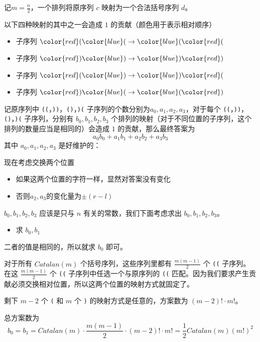 \documentclass[UTF8]{beamer}
\begin{document}
    \begin{frame}
        记$m=\frac{n}{2}$，一个排列将原序列 $c$ 映射为一个合法括号序列 $d$。

以下四种映射的其中之一会造成 $1$ 的贡献（颜色用于表示相对顺序）

\begin{itemize}
    \item 子序列 ${\color{red}(}{\color{blue}(}\to{\color{blue}(}{\color{red}(}$
    \item 子序列 ${\color{red})}{\color{blue})}\to{\color{blue})}{\color{red})}$
    \item 子序列 ${\color{red}(}{\color{blue})}\to{\color{blue})}{\color{red}(}$
    \item 子序列 ${\color{red})}{\color{blue}(}\to{\color{blue}(}{\color{red})}$
\end{itemize}


记原序列中 \texttt{((}，\texttt{))}，\texttt{()}，\texttt{)(} 子序列的个数分别为$a_0,a_1,a_2,a_3$，对于每个 \texttt{((}，\texttt{))}，\texttt{()}，\texttt{)(} 子序列，分别有 $b_0,b_1,b_2,b_3$ 个排列的映射（对于不同位置的子序列，这个排列的数量应当是相同的）会造成 $1$ 的贡献，那么最终答案为
$$
a_0b_0+a_1b_1+a_2b_2+a_3b_3
$$
\pause
其中 $a_0,a_1,a_2,a_3$ 是好维护的：

现在考虑交换两个位置
\begin{itemize}
    \item 如果这两个位置的字符一样，显然对答案没有变化
    \item 否则$a_2,a_3$的变化量为$\pm (r-l)$
\end{itemize}

$b_0,b_1,b_2,b_3$ 应该是只与 $n$ 有关的常数，我们下面考虑求出 $b_0,b_1,b_2,b_3$。
    \end{frame}

    \begin{frame}
        \begin{itemize}
            \item 求 $b_0,b_1$
        \end{itemize}

        二者的值是相同的，所以就求 $b_0$ 即可。

        对于所有 $Catalan(m)$ 个括号序列，这些序列里都有 $\frac{m(m-1)}{2}$ 个 \texttt{((} 子序列。在这 $\frac{m(m-1)}{2}$ 个 \texttt{((} 子序列中任选一个与原序列的 \texttt{((} 匹配。因为我们要求产生贡献必须交换相对位置，所以这两个位置的映射方式就固定了。

        剩下 $m-2$ 个 \texttt{(} 和 $m$ 个 \texttt{)} 的映射方式是任意的，方案数为 $(m-2)!\cdot m!$。

        总方案数为
        $$
        b_0=b_1 = Catalan(m)\cdot \frac{m(m-1)}{2} \cdot (m-2)!\cdot m!= \frac 12Catalan(m) (m!)^2
        $$
    \end{frame}
\end{document}

